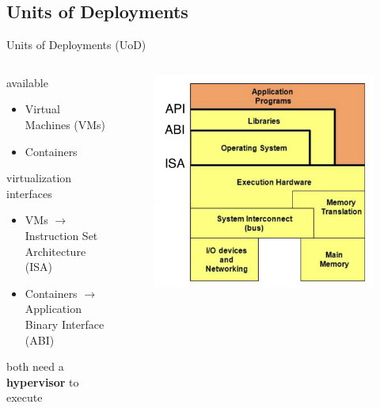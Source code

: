 \subsection{Units of Deployments}
\begin{frame}{Units of Deployments (UoD)}
	\only<1>
	{
		\begin{columns}
			\begin{column}{0.7\textwidth}
				available
				\begin{itemize}
					\item{\footnotesize{Virtual Machines (VMs)}}
					\item{\footnotesize{Containers}}
				\end{itemize}
				virtualization interfaces
				\begin{itemize}
				\item{\footnotesize{VMs $\rightarrow{}$ Instruction Set Architecture (ISA)}}
				\item{\footnotesize{Containers $\rightarrow{}$ Application Binary Interface (ABI)}}
				\end{itemize}
				\begin{center}
					both need a \textbf{hypervisor} to execute
				\end{center}
			\end{column}
			\begin{column}{0.3\textwidth}
				\begin{figure}
					\centering{}
					\includegraphics[scale=0.11]{images/virtualization-level.png}

\end{figure}
\end{column}
\end{columns}}
\end{frame}
